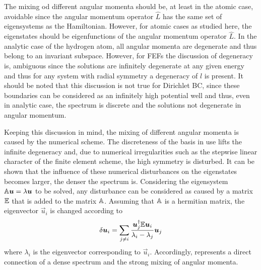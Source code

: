 The mixing od different angular momenta should be, at least in the atomic case, avoidable since the angular momentum operator $\hat{L}$ has the same set of eigensystems as the Hamiltonian.
However, for atomic cases as studied here, the eigenstates should be eigenfunctions of the angular momentum operator $\hat{L}$.
In the analytic case of the hydrogen atom, all angular momenta are degenerate and thus belong to an invariant subspace.
However, for FEFs the discussion of degeneracy is, ambiguous since the solutions are infinitely degenerate at any given energy and thus for any system with radial symmetry a degeneracy of $l$ is present.
It should be noted that this discussion is not true for Dirichlet BC, since these boundaries can be considered as an infinitely high potential well and thus, even in analytic case, the spectrum is discrete and the solutions not degenerate in angular momentum.

Keeping this discussion in mind, the mixing of different angular momenta is caused by the numerical scheme.
The discreteness of the basis in use lifts the infinite degeneracy and, due to numerical irregularities such as the stepwise linear character of the finite element scheme, the high symmetry is disturbed.
It can be shown that the influence of these numerical disturbances on the eigenstates becomes larger, the denser the spectrum is.
Considering the eigensystem $\mathbb{A}\bm{u}=\lambda\bm{u}$ to be solved, any disturbance can be considered as caused by a matrix $\mathbb{E}$ that is added to the matrix $\mathbb{A}$.
Assuming that $\mathbb{A}$ is a hermitian matrix, the eigenvector $\vec{u}_i$ is changed according to \cite{saad, wilkinson}
\begin{equation}\label{eq:ErrVect}
\delta \bm{u}_i=\sum_{j\neq i} \frac{\bm{u}_j^\dagger\mathbb{E}\bm{u}_i}{\lambda_i-\lambda_j} \bm{u}_j
\end{equation}
where $\lambda_i$ is the eigenvector corresponding to $\vec{u}_i$.
Accordingly,  represents a direct connection of a dense spectrum and the strong mixing of angular momenta.

